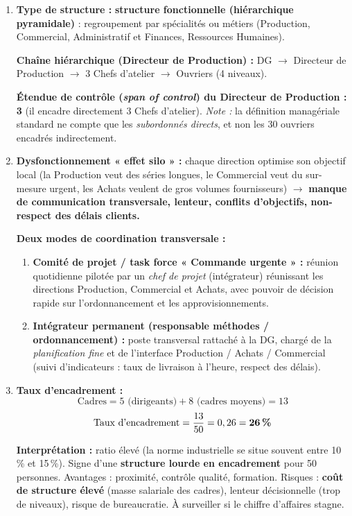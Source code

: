 \documentclass[11pt]{article}
\begin{document}
\begin{corrige}
\begin{enumerate}
    \item \textbf{Type de structure :} \textbf{structure fonctionnelle (hiérarchique pyramidale)} : regroupement par spécialités ou métiers (Production, Commercial, Administratif et Finances, Ressources Humaines).

    \textbf{Chaîne hiérarchique (Directeur de Production) :} DG $\rightarrow$ Directeur de Production $\rightarrow$ 3 Chefs d'atelier $\rightarrow$ Ouvriers (4 niveaux).

    \textbf{Étendue de contrôle (\emph{span of control}) du Directeur de Production :} \textbf{3} (il encadre directement 3 Chefs d'atelier). \emph{Note :} la définition managériale standard ne compte que les \emph{subordonnés directs}, et non les 30 ouvriers encadrés indirectement.

    \item \textbf{Dysfonctionnement « effet silo » :} chaque direction optimise son objectif local (la Production veut des séries longues, le Commercial veut du sur-mesure urgent, les Achats veulent de gros volumes fournisseurs) $\rightarrow$ \textbf{manque de communication transversale, lenteur, conflits d'objectifs, non-respect des délais clients.}

    \textbf{Deux modes de coordination transversale :}
    \begin{enumerate}
        \item \textbf{Comité de projet / task force « Commande urgente » :} réunion quotidienne pilotée par un \emph{chef de projet} (intégrateur) réunissant les directions Production, Commercial et Achats, avec pouvoir de décision rapide sur l'ordonnancement et les approvisionnements.
        \item \textbf{Intégrateur permanent (responsable méthodes / ordonnancement) :} poste transversal rattaché à la DG, chargé de la \emph{planification fine} et de l'interface Production / Achats / Commercial (suivi d'indicateurs : taux de livraison à l'heure, respect des délais).
    \end{enumerate}

    \item \textbf{Taux d'encadrement :}
    \[ \text{Cadres} = 5 \text{ (dirigeants)} + 8 \text{ (cadres moyens)} = 13 \]
    \[ \text{Taux d'encadrement} = \frac{13}{50} = 0,26 = \textbf{26\,\%} \]

    \textbf{Interprétation :} ratio élevé (la norme industrielle se situe souvent entre 10\,\% et 15\,\%). Signe d'une \textbf{structure lourde en encadrement} pour 50 personnes. Avantages : proximité, contrôle qualité, formation. Risques : \textbf{coût de structure élevé} (masse salariale des cadres), lenteur décisionnelle (trop de niveaux), risque de bureaucratie. À surveiller si le chiffre d'affaires stagne.
\end{enumerate}
\end{corrige}
\end{document}
